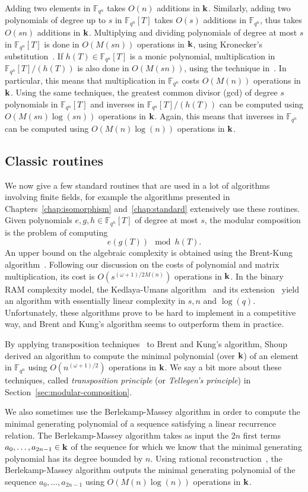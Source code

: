 Adding two elements in $\mathbb{F}_{q^n}$ takes $O(n)$ additions in $\mathbf{k}$.
Similarly, adding two polynomials of degree up to $s$ in $\mathbb{F}_{q^n}\left[
T \right]$ takes $O(s)$ additions in $\mathbb{F}_{q^n}$, thus takes $O(sn)$
additions in $\mathbf{k}$. Multiplying and dividing polynomials of degree at most $s$ in
$\mathbb{F}_{q^n}\left[ T \right]$ is done in $O(M(sn))$
operations in $\mathbf{k}$, using Kronecker's substitution~\cite{Moenck76, Kaltofen87,
GG13, GS92, Harvey09}. If $h(T)\in\mathbb{F}_{q^n}[T]$ is a monic polynomial,
multiplication in $\mathbb{F}_{q^n}[T]/(h(T))$ is also done in $O(M(sn))$, using
the technique in~\cite{PS06}. In particular, this means that multiplication in
$\mathbb{F}_{q^n}$ costs $O(M(n))$ operations in $\mathbf{k}$. Using the same techniques,
the greatest common divisor (gcd) of degree $s$ polynomials in
$\mathbb{F}_{q^n}[T]$ and inverses in $\mathbb{F}_{q^n}[T]/(h(T))$ can be
computed using $O(M(sn)\log(sn))$ operations in $\mathbf{k}$. Again, this means that
inverses in $\mathbb{F}_{q^n}$ can be computed using $O(M(n)\log(n))$
operations in $\mathbf{k}$.

\subsection{Classic routines}

We now give a few standard routines that are used in a lot of algorithms
involving finite fields, for example the algorithms presented in
Chapters~\ref{chap:isomorphism} and~\ref{chap:standard} extensively use these
routines.
Given polynomials $e, g, h\in\mathbb{F}_{q^n}[T]$ of degree at most $s$, the
modular composition is the problem of computing
\[
  e(g(T))\mod h(T).
\]
An upper bound on the algebraic complexity is obtained using the Brent-Kung
algorithm~\cite{BK78}. Following our discussion on the costs of polynomial
and matrix multiplication, its cost is $O(s^{(\omega+1)/2M(n)})$ operations in
$\mathbf{k}$. In the binary RAM complexity model, the Kedlaya-Umans
algorithm~\cite{KU11} and its extension~\cite{PS13} yield an algorithm with
essentially linear complexity in $s, n$ and $\log(q)$. Unfortunately, these
algorithms prove to be hard to implement in a competitive way, and Brent and
Kung's algorithm seems to outperform them in practice.

By applying transposition techniques~\cite{BLS03, DeFeo10, DS10, BCS13} to Brent
and Kung's algorithm, Shoup~\cite{Shoup94, Shoup99} derived an algorithm to
compute the minimal polynomial (over $\mathbf{k}$) of an element in $\mathbb{F}_{q^n}$
using $O(n^{(\omega+1)/2})$ operations in $\mathbf{k}$. We say a bit more about these
techniques, called \emph{transposition principle} (or \emph{Tellegen's
principle}) in Section~\ref{sec:modular-composition}.

We also sometimes use the Berlekamp-Massey algorithm in order to compute the
minimal generating polynomial of a sequence satisfying a linear recurrence
relation. The Berlekamp-Massey algorithm takes
as input the $2n$ first terms $a_0, \dots, a_{2n-1}\in\mathbf{k}$ of the
sequence for which we know that the minimal generating polynomial has its degree
bounded by $n$. Using rational reconstruction~\cite[Chapter 7]{BCGLLSS17},
the Berlekamp-Massey algorithm outputs the minimal generating polynomial of the
sequence $a_0, \dots, a_{2n-1}$ using $O(M(n)\log(n))$ operations in $\mathbf{k}$.
